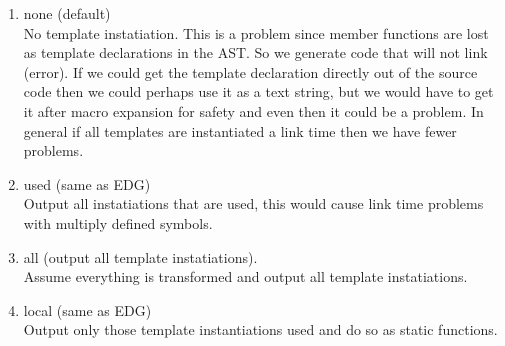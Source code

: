 {\begin{enumerate}
   \item none (default) \\
         No template instatiation. This is a problem since member functions are lost as
         template declarations in the AST.  So we generate code that will not link
         (error).  If we could get the template declaration directly out of the source
         code then we could perhaps use it as a text string, but we would have to get it
         after macro expansion for safety and even then it could be a problem. In general
         if all templates are instantiated a link time then we have fewer problems.
   \item used (same as EDG) \\
         Output all instatiations that are used, this would cause link time problems with
         multiply defined symbols.
   \item all (output all template instatiations). \\
         Assume everything is transformed and output all template instatiations.
   \item local (same as EDG) \\
         Output only those template instantiations used and do so as static functions.         
\end{enumerate}
}


